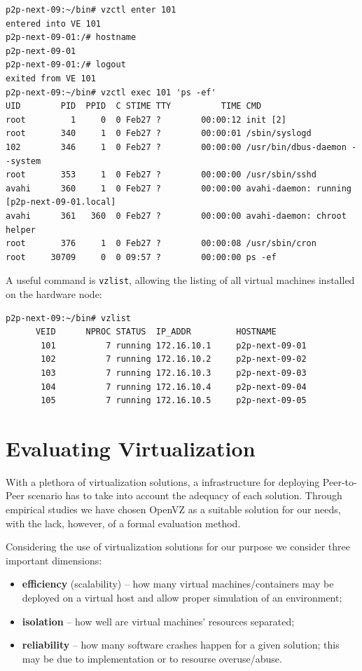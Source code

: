 \footnotesize
\begin{verbatim}
p2p-next-09:~/bin# vzctl enter 101
entered into VE 101
p2p-next-09-01:/# hostname
p2p-next-09-01
p2p-next-09-01:/# logout
exited from VE 101
p2p-next-09:~/bin# vzctl exec 101 'ps -ef'
UID        PID  PPID  C STIME TTY          TIME CMD
root         1     0  0 Feb27 ?        00:00:12 init [2]
root       340     1  0 Feb27 ?        00:00:01 /sbin/syslogd
102        346     1  0 Feb27 ?        00:00:00 /usr/bin/dbus-daemon --system
root       353     1  0 Feb27 ?        00:00:00 /usr/sbin/sshd
avahi      360     1  0 Feb27 ?        00:00:00 avahi-daemon: running [p2p-next-09-01.local]
avahi      361   360  0 Feb27 ?        00:00:00 avahi-daemon: chroot helper
root       376     1  0 Feb27 ?        00:00:08 /usr/sbin/cron
root     30709     0  0 09:57 ?        00:00:00 ps -ef
\end{verbatim}
\normalsize

A useful command is \texttt{vzlist}, allowing the listing of all virtual
machines  installed on the hardware node:

\footnotesize
\begin{verbatim}
p2p-next-09:~/bin# vzlist
      VEID      NPROC STATUS  IP_ADDR         HOSTNAME
       101          7 running 172.16.10.1     p2p-next-09-01
       102          7 running 172.16.10.2     p2p-next-09-02
       103          7 running 172.16.10.3     p2p-next-09-03
       104          7 running 172.16.10.4     p2p-next-09-04
       105          7 running 172.16.10.5     p2p-next-09-05
\end{verbatim}
\normalsize

\section{Evaluating Virtualization}

With a plethora of virtualization solutions, a infrastructure for deploying
Peer-to-Peer scenario has to take into account the adequacy of each solution.
Through empirical studies we have chosen OpenVZ as a suitable solution for our
needs, with the lack, however, of a formal evaluation method.

Considering the use of virtualization solutions for our purpose we consider
three important dimensions:

\begin{itemize}
  \item \textbf{efficiency} (scalability) -- how many virtual
  machines/containers may be deployed on a virtual host and allow proper
  simulation of an environment;
  \item \textbf{isolation} -- how well are virtual machines' resources
  separated;
  \item \textbf{reliability} -- how many software crashes happen for a given
  solution; this may be due to implementation or to resourse overuse/abuse.
\end{itemize}

